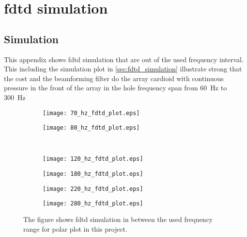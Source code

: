 \chapter{\gls{fdtd} simulation}

\section{Simulation}
This appendix shows \gls{fdtd} simulation that are out of the used frequency interval. This including the simulation plot in \autoref{sec:fdtd_simulation} illustrate strong that the cost and the beamforming filter do the array cardioid with continuous pressure in the front of the array in the hole frequency span from \SI{60}{\hertz} to \SI{300}{\hertz}



\begin{figure}[H]
\begin{subfigure}[c]{0.5\textwidth}
\texttt{[image: 70\_hz\_fdtd\_plot.eps]}
\label{fig:ap:}
\end{subfigure}
\begin{subfigure}[c]{0.5\textwidth}
\texttt{[image: 80\_hz\_fdtd\_plot.eps]}
\label{fig:filter_vs_data_finisha}
\end{subfigure}\\
\hspace{0.1\textheight}
\begin{subfigure}[c]{0.5\textwidth}
\texttt{[image: 120\_hz\_fdtd\_plot.eps]}
\label{fig:opt_res_c_finisha}
\end{subfigure}
\begin{subfigure}[c]{0.5\textwidth}
\texttt{[image: 180\_hz\_fdtd\_plot.eps]}
\label{fig:polar_filtered_finisha}
\end{subfigure}
\begin{subfigure}[c]{0.5\textwidth}
\texttt{[image: 220\_hz\_fdtd\_plot.eps]}
\label{fig:opt_res_c_finisha}
\end{subfigure}
\begin{subfigure}[c]{0.5\textwidth}
\texttt{[image: 280\_hz\_fdtd\_plot.eps]}
\label{fig:polar_filtered_finisha}
\end{subfigure}
\caption{The figure shows \gls{fdtd} simulation in between the used frequency range for polar plot in this project.}
		\label{fig:opt_res_finisha}
\end{figure}

